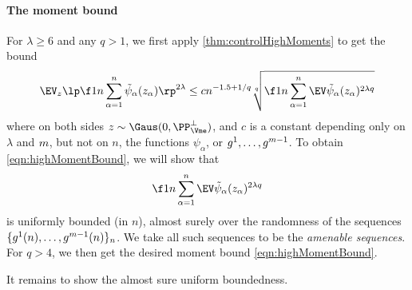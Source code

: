 \documentclass[main.tex]{subfiles}
\begin{document}
\paragraph{The moment bound}
For $\lambda \ge 6$ and any $q > 1$, we first apply \cref{thm:controlHighMoments} to get the bound
\begin{equation*}
\EV_{\rvec} 
    \lp \f 1 n \sum_{\alpha =1}^n \tilde \psi_\alpha(\rvec_\alpha)\rp^{2\lambda}
    \le c n^{-1.5 + 1/q}
        \sqrt[q]{\f 1 n \sum_{\alpha=1}^n \EV \tilde \psi_\alpha(\rvec_\alpha)^{2\lambda q}}
\end{equation*}
where on both sides $\rvec \sim \Gaus(0, \PP^\perp_{\Vme})$, and $c$ is a constant depending only on $\lambda$ and $m$, but not on $n$, the functions $\psi_\alpha$, or $g^1, \ldots, g^{m-1}$.
To obtain \cref{eqn:highMomentBound}, we will show that
\begin{equation}
\f 1 n \sum_{\alpha=1}^n \EV \tilde \psi_\alpha(\rvec_\alpha)^{2\lambda q}
\label{eqn:moment}
\end{equation}
is uniformly bounded (in $n$), almost surely over the randomness of the sequences $\{g^1(n), \ldots, g^{m -1}(n)\}_n$.
We take all such sequences to be the \emph{amenable sequences}.
For $q > 4$, we then get the desired moment bound \cref{eqn:highMomentBound}.

It remains to show the almost sure uniform boundedness.
\end{document}
